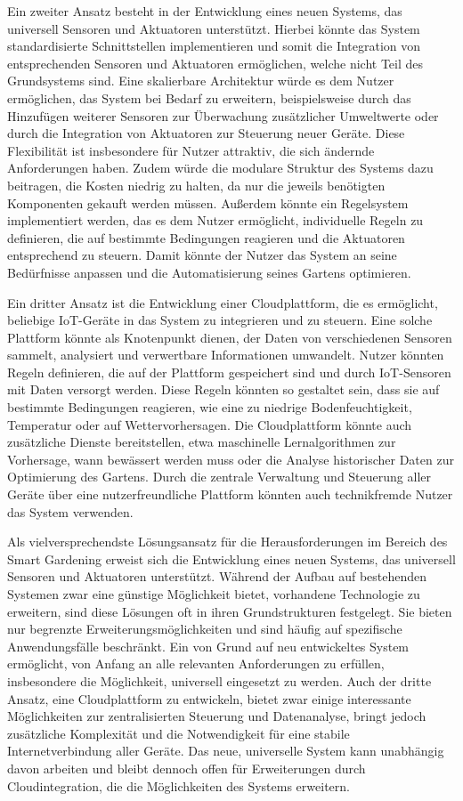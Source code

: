 Ein zweiter Ansatz besteht in der Entwicklung eines neuen Systems, das universell Sensoren und Aktuatoren unterstützt.
Hierbei könnte das System standardisierte Schnittstellen implementieren und somit die Integration von entsprechenden Sensoren und Aktuatoren ermöglichen, welche nicht Teil des Grundsystems sind.
Eine skalierbare Architektur würde es dem Nutzer ermöglichen, das System bei Bedarf zu erweitern, beispielsweise durch das Hinzufügen weiterer Sensoren zur Überwachung zusätzlicher Umweltwerte oder durch die Integration von Aktuatoren zur Steuerung neuer Geräte.
Diese Flexibilität ist insbesondere für Nutzer attraktiv, die sich ändernde Anforderungen haben.
Zudem würde die modulare Struktur des Systems dazu beitragen, die Kosten niedrig zu halten, da nur die jeweils benötigten Komponenten gekauft werden müssen.
Außerdem könnte ein Regelsystem implementiert werden, das es dem Nutzer ermöglicht, individuelle Regeln zu definieren, die auf bestimmte Bedingungen reagieren und die Aktuatoren entsprechend zu steuern.
Damit könnte der Nutzer das System an seine Bedürfnisse anpassen und die Automatisierung seines Gartens optimieren.

Ein dritter Ansatz ist die Entwicklung einer Cloudplattform, die es ermöglicht, beliebige IoT-Geräte in das System zu integrieren und zu steuern.
Eine solche Plattform könnte als Knotenpunkt dienen, der Daten von verschiedenen Sensoren sammelt, analysiert und verwertbare Informationen umwandelt.
Nutzer könnten Regeln definieren, die auf der Plattform gespeichert sind und durch IoT-Sensoren mit Daten versorgt werden.
Diese Regeln könnten so gestaltet sein, dass sie auf bestimmte Bedingungen reagieren, wie eine zu niedrige Bodenfeuchtigkeit, Temperatur oder auf Wettervorhersagen.
Die Cloudplattform könnte auch zusätzliche Dienste bereitstellen, etwa maschinelle Lernalgorithmen zur Vorhersage, wann bewässert werden muss oder die Analyse historischer Daten zur Optimierung des Gartens.
Durch die zentrale Verwaltung und Steuerung aller Geräte über eine nutzerfreundliche Plattform könnten auch technikfremde Nutzer das System verwenden.

Als vielversprechendste Lösungsansatz für die Herausforderungen im Bereich des Smart Gardening erweist sich die Entwicklung eines neuen Systems, das universell Sensoren und Aktuatoren unterstützt.
Während der Aufbau auf bestehenden Systemen zwar eine günstige Möglichkeit bietet, vorhandene Technologie zu erweitern, sind diese Lösungen oft in ihren Grundstrukturen festgelegt.
Sie bieten nur begrenzte Erweiterungsmöglichkeiten und sind häufig auf spezifische Anwendungsfälle beschränkt.
Ein von Grund auf neu entwickeltes System ermöglicht, von Anfang an alle relevanten Anforderungen zu erfüllen, insbesondere die Möglichkeit, universell eingesetzt zu werden.
Auch der dritte Ansatz, eine Cloudplattform zu entwickeln, bietet zwar einige interessante Möglichkeiten zur zentralisierten Steuerung und Datenanalyse, bringt jedoch zusätzliche Komplexität und die Notwendigkeit für eine stabile Internetverbindung aller Geräte.
Das neue, universelle System kann unabhängig davon arbeiten und bleibt dennoch offen für Erweiterungen durch Cloudintegration, die die Möglichkeiten des Systems erweitern.

